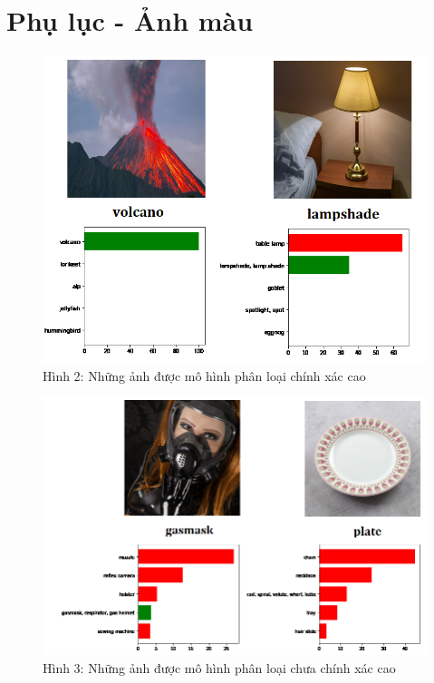 \documentclass[a4paper]{article}
\begin{document}
\section{Phụ lục - Ảnh màu}
\begin{figure}[h!]
\centering
\includegraphics[width=16cm]{images/res1.PNG}
\caption*{Hình 2: Những ảnh được mô hình phân loại chính xác cao}
\end{figure}

\clearpage

\begin{figure}[h!]
\centering
\includegraphics[width=16cm]{images/res2.PNG}
\caption*{Hình 3: Những ảnh được mô hình phân loại chưa chính xác cao}
\end{figure}
\end{document}
